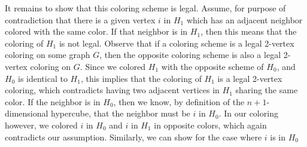 \begin{solution}[1in]
It remains to show that this coloring scheme is legal. Assume, for purpose of contradiction that there is a given 
vertex $i$ in $H_1$ which has an adjacent neighbor colored with the 
same color. If that neighbor is in $H_1$, then this means that the 
coloring of $H_1$ is not legal. Observe that if a coloring scheme is 
a legal 2-vertex coloring on some graph $G$, then the opposite 
coloring scheme is also a legal 2-vertex coloring on $G$. Since we 
colored $H_1$ with the opposite scheme of $H_0$, and $H_0$ is identical 
to $H_1$, this implies that the coloring of $H_1$ is a legal 2-vertex 
coloring, which contradicts having two adjacent vertices in $H_1$ 
sharing the same color. If the neighbor is in $H_0$, then we know, 
by definition of the $n + 1$-dimensional hypercube, that the neighbor 
must be $i$ in $H_0$. In our coloring however, we colored $i$ in $H_0$ 
and $i$ in $H_1$ in opposite colors, which again contradicts our 
assumption. Similarly, we can show for the case where $i$ is in $H_0$
\end{solution}
